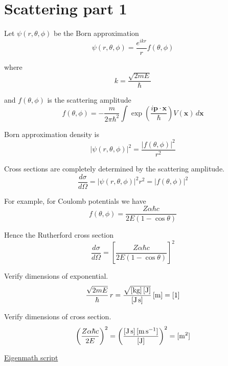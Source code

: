 

\section*{Scattering part 1}

Let $\psi(r,\theta,\phi)$ be the Born approximation
\begin{equation*}
\psi(r,\theta,\phi)=\frac{e^{ikr}}{r}f(\theta,\phi)
\end{equation*}

where
\begin{equation*}
k=\frac{\sqrt{2mE}}{\hbar}
\end{equation*}

and $f(\theta,\phi)$ is the scattering amplitude
\begin{equation*}
f(\theta,\phi)=-\frac{m}{2\pi\hbar^2}
\int\exp\left(\frac{i\mathbf p\cdot\mathbf x}{\hbar}\right)V(\mathbf x)\,d\mathbf x
\end{equation*}

Born approximation density is
\begin{equation*}
|\psi(r,\theta,\phi)|^2=\frac{|f(\theta,\phi)|^2}{r^2}
\end{equation*}

Cross sections are completely determined by the scattering amplitude.
\begin{equation*}
\frac{d\sigma}{d\Omega}=\left|\psi(r,\theta,\phi)\right|^2r^2=|f(\theta,\phi)|^2
\end{equation*}

For example, for Coulomb potentials we have
\begin{equation*}
f(\theta,\phi)=\frac{Z\alpha\hbar c}{2E(1-\cos\theta)}
\end{equation*}

Hence the Rutherford cross section
\begin{equation*}
\frac{d\sigma}{d\Omega}=\left[\frac{Z\alpha\hbar c}{2E(1-\cos\theta)}\right]^2
\end{equation*}

Verify dimensions of exponential.
\begin{equation*}
\frac{\sqrt{2mE}}{\hbar}\,r
=\frac{\sqrt{[\text{kg}]\,[\text J]}}{[\text J\,\text s]}\,[\text m]=[1]
\end{equation*}

Verify dimensions of cross section.
\begin{equation*}
\left(\frac{Z\alpha\hbar c}{2E}\right)^2
=\left(\frac{[\text J\,\text s]\,[\text m\,\text s^{-1}]}{[\text J]}\right)^2=[\text m^2]
\end{equation*}

\href{https://georgeweigt.github.io/examples/scattering-part-1-demo.html}{Eigenmath script}


